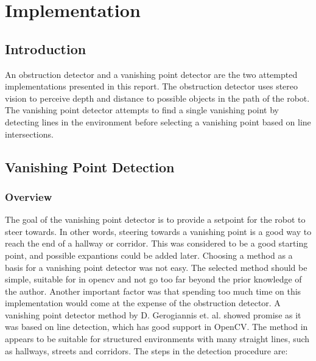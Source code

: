 \chapter{Implementation}\label{chp:implementation}

\section{Introduction}

An obstruction detector and a vanishing point detector are the two attempted implementations presented in this report. The obstruction detector uses stereo vision to perceive depth and distance to possible objects in the path of the robot. The vanishing point detector attempts to find a single vanishing point by detecting lines in the environment before selecting a vanishing point based on line intersections. 

\section{Vanishing Point Detection}

\subsection{Overview}

The goal of the vanishing point detector is to provide a setpoint for the robot to steer towards. In other words, steering towards a vanishing point is a good way to reach the end of a hallway or corridor. This was considered to be a good starting point, and possible expantions could be added later. Choosing a method as a basis for a vanishing point detector was not easy. The selected method should be simple, suitable for in \gls{opencv} and not go too far beyond the prior knowledge of the author. Another important factor was that spending too much time on this implementation would come at the expense of the obstruction detector. A vanishing point detector method by D. Gerogiannis et. al. \cite{gerogiannisvp} showed promise as it was based on line detection, which has good support in OpenCV. The method in \cite{gerogiannisvp} appears to be suitable for structured environments with many straight lines, such as hallways, streets and corridors. The steps in the detection procedure are:

